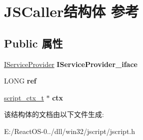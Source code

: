\hypertarget{struct_j_s_caller}{}\section{J\+S\+Caller结构体 参考}
\label{struct_j_s_caller}
\subsection*{Public 属性}
\begin{DoxyCompactItemize}
\item 
\mbox{\label{struct_j_s_caller_a2fe8ea9cd88a24890289bdaa2ef086f5}} 
\hyperlink{interface_i_service_provider}{I\+Service\+Provider} {\bfseries I\+Service\+Provider\+\_\+iface}
\item 
\mbox{\label{struct_j_s_caller_a017c973837d109d38dbe14fefe82121f}} 
L\+O\+NG {\bfseries ref}
\item 
\mbox{\label{struct_j_s_caller_a2b0e89c3b331c873422582b79f343776}} 
\hyperlink{struct__script__ctx__t}{script\+\_\+ctx\+\_\+t} $\ast$ {\bfseries ctx}
\end{DoxyCompactItemize}


该结构体的文档由以下文件生成\+:\begin{DoxyCompactItemize}
\item 
E\+:/\+React\+O\+S-\/0../dll/win32/jscript/jscript.\+h\end{DoxyCompactItemize}
